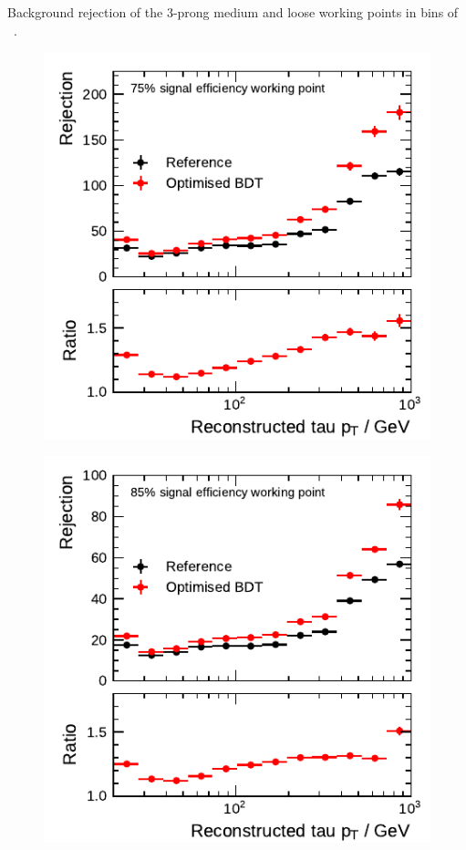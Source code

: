 \begin{minipage}{\textwidth}
\begin{subfigure}{0.48\textwidth}
  \end{subfigure}
  \caption[Background rejection of the 3-prong medium and loose working points
  in bins of \tauhadvis~\pt for the BDT-based identification]{Background
    rejection of the 3-prong medium and loose working points in bins of
    \tauhadvis~\pt.}
\end{minipage}

\clearpage

\noindent
\begin{minipage}{\textwidth}
  \captionsetup{type=figure}
  \begin{subfigure}{0.48\textwidth}
    \centering
    \includegraphics{./figures/bdt_perf/post_optimisation/1p_highpt/rejection_medium_ratio_highpt.pdf}
  \end{subfigure}\hfill
  \begin{subfigure}{0.48\textwidth}
    \centering
    \includegraphics{./figures/bdt_perf/post_optimisation/1p_highpt/rejection_loose_ratio_highpt.pdf}

\end{subfigure}
\end{minipage}
